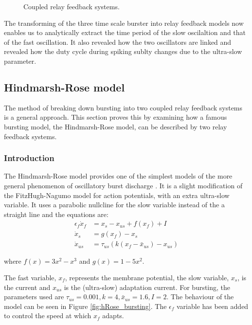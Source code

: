 \documentclass[a4paper, 12pt]{article}
\begin{document}
\begin{figure}
\caption{Coupled relay feedback systems.}
\label{fig:bursting_step4}
\end{figure}

The transforming of the three time scale burster into relay feedback models now enables us to analytically extract the time period of the slow oscilaltion and that of the fast oscillation. It also revealed how the two oscillators are linked and revealed how the duty cycle during spiking sublty changes due to the ultra-slow parameter. 

\FloatBarrier
\subsection{Hindmarsh-Rose model}
The method of breaking down bursting into two coupled relay feedback systems is a general approach. This section proves this by examining how a famous bursting model, the Hindmarsh-Rose model, can be described by two relay feedback systems. 
\subsubsection{Introduction}
The Hindmarsh-Rose model provides one of the simplest models of the more general phenomenon of oscillatory burst discharge \cite{hindmarsh}. It is a slight modification of the FitzHugh-Nagumo model for action potentials, with an extra ultra-slow variable. It uses a parabolic nullcline for the slow variable instead of the a straight line and the equations are:
\begin{align}
\epsilon_f\dot{x}_f &= x_s -x_{us} + f(x_f) + I \\
\dot{x}_s &= g(x_f) - x_s\\
\dot{x}_{us} &= \tau_{us}\left(k(x_f-\bar{x}_{us}) - x_{us}\right)
\end{align}
\begin{center}where  $f(x) = 3x^2 - x^3$ and $g(x) = 1 - 5x^2$. \end{center}

The fast variable, $x_f$, represents the membrane potential, the slow variable, $x_s$, is the current and $x_{us}$ is the (ultra-slow) adaptation current. For bursting, the parameters used are $\tau_{us} = 0.001, k = 4, \bar{x}_{us} = 1.6, I = 2$. The behaviour of the model can be seen in Figure \ref{fig:hRose_bursting}. The $\epsilon_f$ variable has been added to control the speed at which $x_f$ adapts. 
\end{document}
